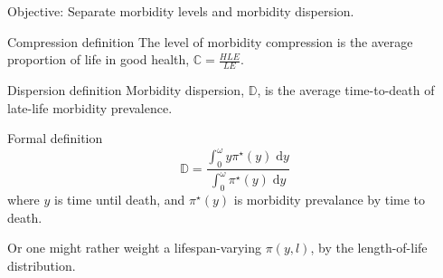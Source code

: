 \documentclass[20pt]{beamer}
\newcommand{\dd}{\; \mathrm{d}}
\begin{document}

\begin{frame}[plain]
\Large
\begin{block}{\Large Objective:}
Separate morbidity levels and morbidity dispersion.
\end{block}
\end{frame}

\begin{frame}[plain]
\Large
\begin{block}{\Large Compression definition}
The level of morbidity compression is the average proportion of life in good
health, $\mathbb{C} = \frac{HLE}{LE}$.
\end{block}
\end{frame}

\begin{frame}[plain]
\vspace{4em}
\Large
\begin{block}{\Large Dispersion definition}
Morbidity dispersion, $\mathbb{D}$, is the average time-to-death of late-life
morbidity prevalence.
\end{block}
\pause

\begin{block}{\Large Formal definition}
\begin{equation}
\mathbb{D} = \frac{\int_0^{\omega} y \pi^\star(y) \dd
y}{\int_0^{\omega}\pi^\star(y)\dd y}
\end{equation}
where $y$ is time until death, and $\pi^\star(y)$ is morbidity
prevalance by time to death.
\end{block}
\vspace{2em}
\pause
Or one might rather weight a lifespan-varying $\pi(y,l)$, by the length-of-life
distribution.

\end{frame}
\end{document}
